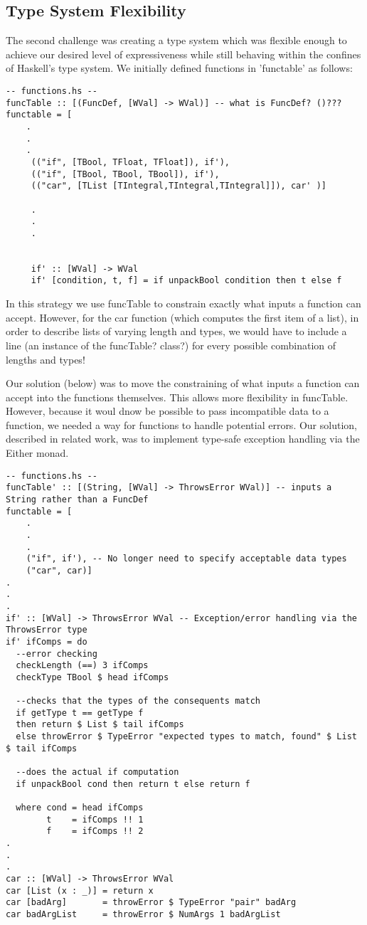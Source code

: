 \documentclass[preprint,nocopyrightspace]{sig-alternate}
\begin{document}
\subsection{Type System Flexibility}
The second challenge was creating a type system which was flexible enough to achieve our desired level of expressiveness while still behaving within the confines of Haskell's type system. We initially defined functions in 'functable' as follows:
\begin{lstlisting}
-- functions.hs --
funcTable :: [(FuncDef, [WVal] -> WVal)] -- what is FuncDef? ()???
functable = [
	.
	.
	.    
     (("if", [TBool, TFloat, TFloat]), if'),
     (("if", [TBool, TBool, TBool]), if'),
     (("car", [TList [TIntegral,TIntegral,TIntegral]]), car' )]
     
     .
     .
     .
     
     
     if' :: [WVal] -> WVal
     if' [condition, t, f] = if unpackBool condition then t else f

\end{lstlisting}
In this strategy we use funcTable to constrain exactly what inputs a function can accept. However, for the car function (which computes the first item of a list), in order to describe lists of varying length and types, we would have to include a line (an instance of the funcTable? class?) for every possible combination of lengths and types!

Our solution (below) was to move the constraining of what inputs a function can accept into the functions themselves. This allows more flexibility in funcTable. However, because it woul dnow be possible to pass incompatible data to a function, we needed a way for functions to handle potential errors. Our solution, described in related work, was to implement type-safe exception handling via the Either monad. 
\begin{lstlisting}
-- functions.hs --
funcTable' :: [(String, [WVal] -> ThrowsError WVal)] -- inputs a String rather than a FuncDef
functable = [
	.
	.
	.   
    ("if", if'), -- No longer need to specify acceptable data types
    ("car", car)]
.
.
.
if' :: [WVal] -> ThrowsError WVal -- Exception/error handling via the ThrowsError type
if' ifComps = do
  --error checking
  checkLength (==) 3 ifComps
  checkType TBool $ head ifComps

  --checks that the types of the consequents match
  if getType t == getType f
  then return $ List $ tail ifComps
  else throwError $ TypeError "expected types to match, found" $ List $ tail ifComps

  --does the actual if computation
  if unpackBool cond then return t else return f

  where cond = head ifComps
        t    = ifComps !! 1
        f    = ifComps !! 2
.
.
.
car :: [WVal] -> ThrowsError WVal
car [List (x : _)] = return x
car [badArg]       = throwError $ TypeError "pair" badArg
car badArgList     = throwError $ NumArgs 1 badArgList

\end{lstlisting} 
\end{document}
